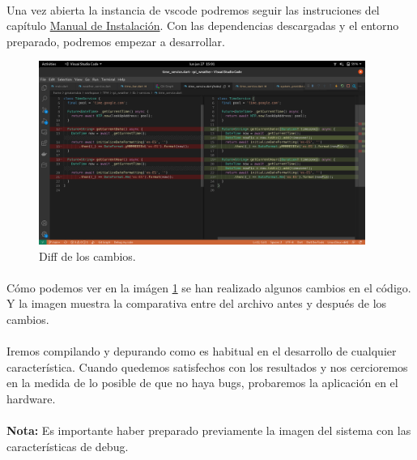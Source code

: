 \paragraph{}Una vez abierta la instancia de \Gls{vscode} podremos seguir las instruciones
del capítulo \href{sec:ManualDeInstalacion}{Manual de Instalación}. Con las dependencias
descargadas y el entorno preparado, podremos empezar a desarrollar.

\begin{figure}[H]
    \centering
    \includegraphics[width=0.95\textwidth]{imgs/dev1}
    \caption[Diff de los cambios.]{Diff de los cambios.}
    \label{imgs:diff-code}
\end{figure}

\paragraph{}Cómo podemos ver en la imágen \ref{imgs:diff-code} se han realizado algunos
cambios en el código. Y la imagen muestra la comparativa entre del archivo antes y después
de los cambios.

\paragraph{}Iremos compilando y depurando como es habitual en el desarrollo de cualquier
característica. Cuando quedemos satisfechos con los resultados y nos cercioremos en la
medida de lo posible de que no haya bugs, probaremos la aplicación en el hardware.

\paragraph{}\textbf{Nota:} Es importante haber preparado previamente la imagen del sistema
con las características de debug.

